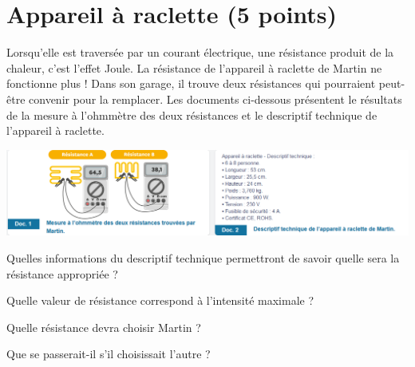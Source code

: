 \section{Appareil à raclette (5 points)}

Lorsqu'elle est traversée par un courant électrique, une résistance produit de la chaleur, c'est l'effet Joule.
La résistance de l'appareil à raclette de Martin ne fonctionne plus ! Dans son garage, il trouve deux résistances qui pourraient peut-être convenir pour la remplacer. 
Les documents ci-dessous présentent le résultats de la mesure à l'ohmmètre des deux résistances et le descriptif technique de l'appareil à raclette.
	\begin{center}
		\includegraphics[scale=0.7]{img/docs}
	\end{center}

\begin{questions}
	\question[1] Quelles informations du descriptif technique permettront de savoir quelle sera la résistance appropriée ?
	
	\question[1\half] Quelle valeur de résistance correspond à l'intensité maximale ?
	
	\question[1\half] Quelle résistance devra choisir Martin ?
	
	\question[1] Que se passerait-il s'il choisissait l'autre ?
\end{questions}